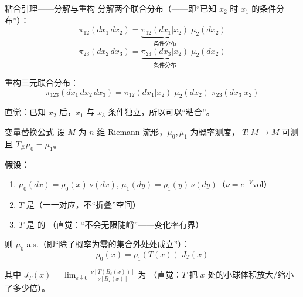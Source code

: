 \documentclass[aspectratio=169,10pt]{beamer}
\begin{document}
\begin{frame}{粘合引理——分解与重构}
  分解两个联合分布（——即``已知 $x_2$ 时 $x_1$ 的条件分布''）：
  \[
    \pi_{12}(dx_1\,dx_2) = \underbrace{\pi_{12}(dx_1|x_2)}_{\text{条件分布}}\;\mu_2(dx_2)
  \]
  \[
    \pi_{23}(dx_2\,dx_3) = \underbrace{\pi_{23}(dx_3|x_2)}_{\text{条件分布}}\;\mu_2(dx_2)
  \]

  重构三元联合分布：
  \[
    \boxed{\pi_{123}(dx_1\,dx_2\,dx_3)
      = \pi_{12}(dx_1|x_2)\;\mu_2(dx_2)\;\pi_{23}(dx_3|x_2)}
  \]

  {\small 直觉：已知 $x_2$ 后，$x_1$ 与 $x_3$ 条件独立，所以可以``粘合''。}

\end{frame}


\begin{frame}{变量替换公式}
  设 $M$ 为 $n$ 维 Riemann 流形，$\mu_0,\mu_1$ 为概率测度，
  $T\colon M\to M$ 可测且 $T_{\#}\mu_0=\mu_1$。

  \vspace{0.3em}
  \textbf{假设：}
  \begin{enumerate}
    \item $\mu_0(dx)=\rho_0(x)\,\nu(dx)$, \quad
      $\mu_1(dy)=\rho_1(y)\,\nu(dy)$\quad（$\nu=e^{-V}\mathrm{vol}$）
    \item $T$ 是（一一对应，不``折叠''空间）
    \item $T$ 是 的
      \;（直觉：``不会无限陡峭''——变化率有界）
  \end{enumerate}

  \vspace{0.3em}
  则 $\mu_0$-a.s.（即``除了概率为零的集合外处处成立''）：
  \[
    \boxed{\rho_0(x) = \rho_1(T(x))\;J_T(x)}
  \]

  其中 $J_T(x) = \displaystyle\lim_{\varepsilon\downarrow 0}
  \frac{\nu[T(B_\varepsilon(x))]}{\nu[B_\varepsilon(x)]}$ 为
  \;（直觉：$T$ 把 $x$ 处的小球体积放大/缩小了多少倍）。
\end{frame}
\end{document}
